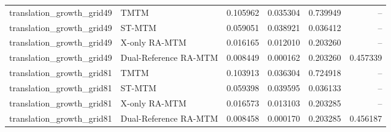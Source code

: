 \begin{tabular}{llrrrr}
translation\_growth\_grid49 & TMTM & 0.105962 & 0.035304 & 0.739949 & -- \\
translation\_growth\_grid49 & ST-MTM & 0.059051 & 0.038921 & 0.036412 & -- \\
translation\_growth\_grid49 & X-only RA-MTM & 0.016165 & 0.012010 & 0.203260 & -- \\
translation\_growth\_grid49 & Dual-Reference RA-MTM & 0.008449 & 0.000162 & 0.203260 & 0.457339 \\
translation\_growth\_grid81 & TMTM & 0.103913 & 0.036304 & 0.724918 & -- \\
translation\_growth\_grid81 & ST-MTM & 0.059398 & 0.039595 & 0.036133 & -- \\
translation\_growth\_grid81 & X-only RA-MTM & 0.016573 & 0.013103 & 0.203285 & -- \\
translation\_growth\_grid81 & Dual-Reference RA-MTM & 0.008458 & 0.000170 & 0.203285 & 0.456187 \\
\end{tabular}
